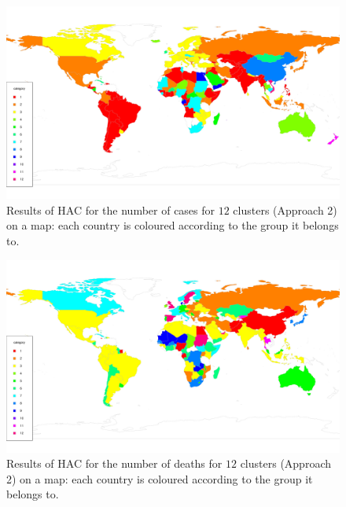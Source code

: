\documentclass[a4paper,12pt]{article}
\numberwithin{equation}{section}
\begin{document}
\newpage 
\FloatBarrier
\begin{figure}[t!]
\begin{minipage}[t]{0.98\textwidth}
\includegraphics[width=\textwidth]{plots/14days/map_alt_12cl}
\caption{Results of HAC for the number of cases for $12$ clusters (Approach 2) on a map: each country is coloured according to the group it belongs to.}\label{fig:map_alt_12cl}
\end{minipage}
\end{figure}

\begin{figure}[t!]
\begin{minipage}[t]{0.98\textwidth}
\includegraphics[width=\textwidth]{plots/deaths/map_alt}
\caption{Results of HAC for the number of deaths for $12$ clusters (Approach 2) on a map: each country is coloured according to the group it belongs to.}\label{fig:map_alt_deaths}
\end{minipage}
\end{figure}
\end{document}
